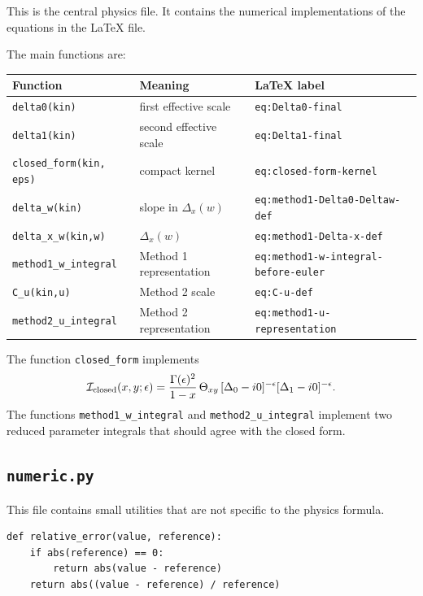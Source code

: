 \documentclass[11pt,a4paper]{article}
\begin{document}
This is the central physics file. It contains the numerical implementations of the equations in the LaTeX file.

The main functions are:
\begin{center}
\begin{tabular}{lll}
\toprule
Function & Meaning & LaTeX label \\
\midrule
\texttt{delta0(kin)} & first effective scale & \texttt{eq:Delta0-final} \\
\texttt{delta1(kin)} & second effective scale & \texttt{eq:Delta1-final} \\
\texttt{closed\_form(kin, eps)} & compact kernel & \texttt{eq:closed-form-kernel} \\
\texttt{delta\_w(kin)} & slope in \(\Delta_x(w)\) & \texttt{eq:method1-Delta0-Deltaw-def} \\
\texttt{delta\_x\_w(kin,w)} & \(\Delta_x(w)\) & \texttt{eq:method1-Delta-x-def} \\
\texttt{method1\_w\_integral} & Method 1 representation & \texttt{eq:method1-w-integral-before-euler} \\
\texttt{C\_u(kin,u)} & Method 2 scale & \texttt{eq:C-u-def} \\
\texttt{method2\_u\_integral} & Method 2 representation & \texttt{eq:method1-u-representation} \\
\bottomrule
\end{tabular}
\end{center}

The function \texttt{closed\_form} implements
\begin{equation}
  \mathcal I_{\rm closed}(x,y;\epsilon)
  = \frac{\Gamma(\epsilon)^2}{1-x}\,
  \Theta_{xy}\,[\Delta_0-i0]^{-\epsilon}[\Delta_1-i0]^{-\epsilon}.
\end{equation}
The functions \texttt{method1\_w\_integral} and \texttt{method2\_u\_integral} implement two reduced parameter integrals that should agree with the closed form.

\subsection{\texttt{numeric.py}}

This file contains small utilities that are not specific to the physics formula.

\begin{lstlisting}
def relative_error(value, reference):
    if abs(reference) == 0:
        return abs(value - reference)
    return abs((value - reference) / reference)
\end{lstlisting}
\end{document}
